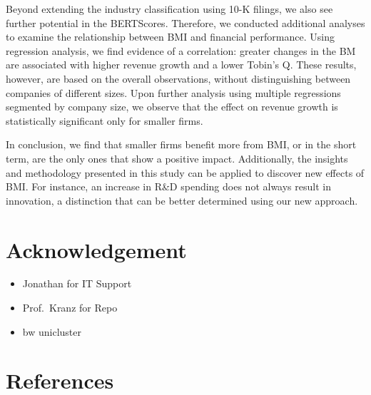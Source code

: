 \documentclass[
]{article}
\providecommand{\tightlist}{%
  \setlength{\itemsep}{0pt}\setlength{\parskip}{0pt}}\usepackage{longtable,booktabs,array}
\begin{document}
Beyond extending the industry classification using 10-K filings, we also
see further potential in the BERTScores. Therefore, we conducted
additional analyses to examine the relationship between BMI and
financial performance. Using regression analysis, we find evidence of a
correlation: greater changes in the BM are associated with higher
revenue growth and a lower Tobin's Q. These results, however, are based
on the overall observations, without distinguishing between companies of
different sizes. Upon further analysis using multiple regressions
segmented by company size, we observe that the effect on revenue growth
is statistically significant only for smaller firms.

In conclusion, we find that smaller firms benefit more from BMI, or in
the short term, are the only ones that show a positive impact.
Additionally, the insights and methodology presented in this study can
be applied to discover new effects of BMI. For instance, an increase in
R\&D spending does not always result in innovation, a distinction that
can be better determined using our new approach.

\section{Acknowledgement}\label{acknowledgement}

\begin{itemize}
\tightlist
\item
  Jonathan for IT Support
\item
  Prof.~Kranz for Repo
\item
  bw unicluster
\end{itemize}

\newpage{}

\section{References}\label{references}
\end{document}
